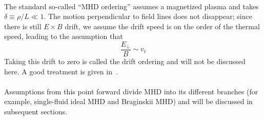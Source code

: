 \\
The standard so-called ``MHD ordering'' assumes a magnetized plasma and takes $\delta\equiv\rho/L\ll1$. The motion perpendicular to field lines does not disappear; since there is still $E\times B$ drift, we assume the drift speed is on the order of the thermal speed, leading to the assumption that
\begin{equation}
  \frac{E_\perp}B\sim v_t
\end{equation}
Taking this drift to zero is called the drift ordering and will not be discussed here. A good treatment is given in~\cite{Hazeltine2004}.\\
\\
Assumptions from this point forward divide MHD into its different branches (for example, single-fluid ideal MHD and Braginskii MHD) and will be discussed in subsequent sections.




